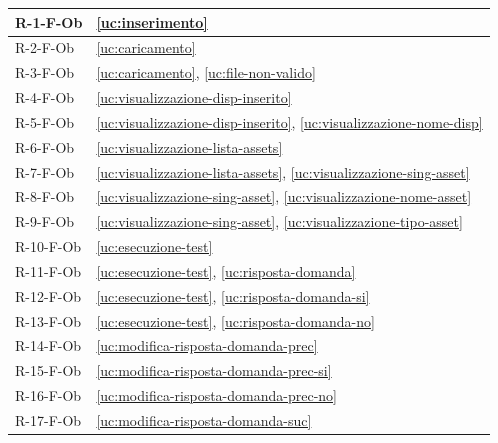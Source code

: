 ﻿\documentclass[a4paper,12pt]{article}
\begin{document}
{\begin{longtable}{|
      >{\centering\arraybackslash}p{}|
      >{\centering\arraybackslash}p{}|
      }
            R-1-F-Ob        & \ref{uc:inserimento}                                                 \\ \hline
            R-2-F-Ob        & \ref{uc:caricamento}                                                 \\ \hline
            R-3-F-Ob        & \ref{uc:caricamento}, \ref{uc:file-non-valido}                         \\ \hline
            R-4-F-Ob        & \ref{uc:visualizzazione-disp-inserito}                                                 \\ \hline
            R-5-F-Ob        & \ref{uc:visualizzazione-disp-inserito}, \ref{uc:visualizzazione-nome-disp}                   \\ \hline
            R-6-F-Ob        & \ref{uc:visualizzazione-lista-assets}                                                 \\ \hline
            R-7-F-Ob        & \ref{uc:visualizzazione-lista-assets}, \ref{uc:visualizzazione-sing-asset}                     \\ \hline
            R-8-F-Ob        & \ref{uc:visualizzazione-sing-asset}, \ref{uc:visualizzazione-nome-asset}               \\ \hline
            R-9-F-Ob        & \ref{uc:visualizzazione-sing-asset}, \ref{uc:visualizzazione-tipo-asset}               \\ \hline
            R-10-F-Ob       & \ref{uc:esecuzione-test}                                                 \\ \hline
            R-11-F-Ob       & \ref{uc:esecuzione-test}, \ref{uc:risposta-domanda}                     \\ \hline
            R-12-F-Ob       & \ref{uc:esecuzione-test}, \ref{uc:risposta-domanda-si}                     \\ \hline
            R-13-F-Ob       & \ref{uc:esecuzione-test}, \ref{uc:risposta-domanda-no}                     \\ \hline
            R-14-F-Ob       & \ref{uc:modifica-risposta-domanda-prec}                                                 \\ \hline
            R-15-F-Ob       & \ref{uc:modifica-risposta-domanda-prec-si}                                                 \\ \hline
            R-16-F-Ob       & \ref{uc:modifica-risposta-domanda-prec-no}                                                 \\ \hline
            R-17-F-Ob       & \ref{uc:modifica-risposta-domanda-suc}                                                 \\ \hline

\end{longtable}}
\end{document}
